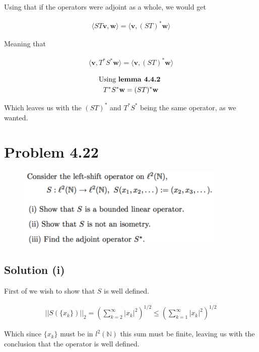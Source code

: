 \documentclass{article}
\begin{document}
Using that if the operators were adjoint as a whole, we would get 

\begin{gather*}
    \langle S T \mathbf{v}, \mathbf{w} \rangle = \langle \mathbf{v}, (ST)^\ast \mathbf{w} \rangle
\end{gather*}

Meaning that 

\begin{gather*}
    \langle \mathbf{v}, T^\ast S^\ast \mathbf{w} \rangle = \langle \mathbf{v}, (ST)^\ast \mathbf{w} \rangle
\end{gather*}

\begin{gather*}
    \text{Using \textbf{lemma 4.4.2} } \\
    T^\ast S^\ast \mathbf{w}= (ST)^\ast \mathbf{w}
\end{gather*}

Which leaves us with the $(ST)^\ast$ and $T^\ast S^\ast$ being the same operator, as we wanted.

\section*{Problem 4.22}
\begin{figure}[h!]
    \centering
    \includegraphics[width=10cm]{fig/prob422.png}
\end{figure}

\subsection*{Solution (i)}

First of we wish to show that $S$ is well defined.

\begin{gather*}
    || S(\{x_k\}) ||_2 = \left(\sum_{k=2}^\infty |x_k|^2 \right)^{1/2} \leq \left(\sum_{k=1}^\infty |x_k|^2 \right)^{1/2}
\end{gather*}

Which since $\{x_k\}$ must be in $l^2(\mathbb{N})$ this sum must be finite, leaving us with the conclusion that the operator is well defined.\\
\end{document}
